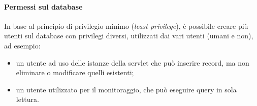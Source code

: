 \paragraph{Permessi sul database}
In base al principio di privilegio minimo (\textit{least privilege}), è possibile creare più utenti sul database con privilegi diversi, utilizzati dai vari utenti (umani e non), ad esempio:
\begin{itemize}
 \item un utente ad uso delle istanze della servlet che può inserire record, ma non eliminare o modificare quelli esistenti;
 \item un utente utilizzato per il monitoraggio, che può eseguire query in sola lettura.
\end{itemize}
